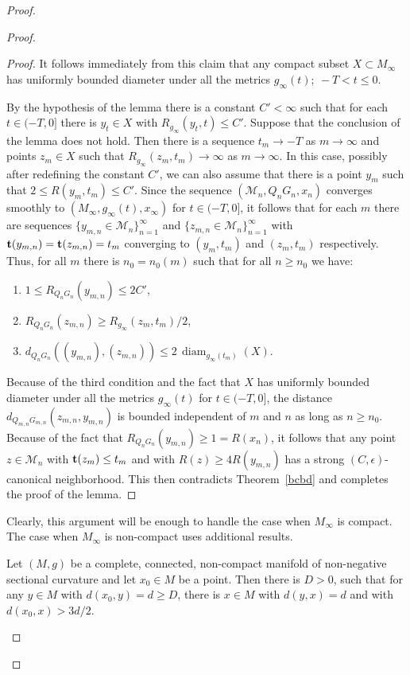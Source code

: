 \begin{proof}
\begin{proof}
\begin{proof}
It follows immediately from this claim that any compact subset
$X\subset M_\infty$ has uniformly bounded diameter under all the
metrics $g_\infty(t);\ -T<t\le 0$.

By the hypothesis of the lemma there is a constant $C'<\infty$ such
that for each $t\in (-T,0]$ there is $y_{t}\in X$ with
$R_{g_\infty}(y_{t},t)\le C'$. Suppose that the conclusion of the
lemma does not hold. Then there is a sequence $t_m\rightarrow -T$ as
$m\rightarrow\infty$ and points $z_m\in X$ such that
$R_{g_\infty}(z_m,t_m)\rightarrow\infty$ as $m\rightarrow\infty$. In
this case, possibly after redefining the constant $C'$, we can also
assume that there is a point $y_m$ such that $2\le R(y_m,t_m)\le
C'$. Since the sequence $({\mathcal M}_n,Q_nG_n,x_n)$ converges
smoothly to $(M_\infty,g_\infty(t),x_\infty)$ for $t\in (-T,0]$, it
follows that for each $m$ there are sequences $\{y_{m,n}\in
{\mathcal M}_n\}_{n=1}^\infty$ and $\{z_{m,n}\in {\mathcal
M}_n\}_{n=1}^\infty$ with ${\bf t}(y_{m,n})={\bf t}(z_{m,n})=t_m$
converging to $(y_m,t_m)$ and $(z_m,t_m)$ respectively. Thus, for
all $m$ there is $n_0=n_0(m)$ such that for all $n\ge n_0$ we have:
\begin{enumerate}
\item[(1)] $1\le R_{Q_nG_n}(y_{m,n})\le 2C'$,
\item[(2)] $R_{Q_nG_n}(z_{m,n})\ge R_{g_\infty}(z_m,t_m)/2$,
\item[(3)] $d_{Q_nG_n}((y_{m,n}),(z_{m,n}))\le 2\,\operatorname{diam}_{g_\infty(t_m)}(X).$
\end{enumerate}
Because of the third condition and the fact that $X$ has uniformly
bounded diameter under all the metrics $g_\infty(t)$ for $t\in
(-T,0]$, the distance $d_{Q_{m,n}G_{m,n}}(z_{m,n},y_{m,n})$ is
bounded independent of $m$ and $n$ as long as $n\ge n_0$. Because of
the fact that $R_{Q_nG_n}(y_{m,n})\ge 1=R(x_n)$, it follows that any
point $z\in {\mathcal M}_n$ with ${\bf t}(z_m)\le t_{m}$ and with
$R(z)\ge 4R(y_{m,n})$ has a strong $(C,\epsilon)$-canonical
neighborhood. This then
contradicts Theorem~\ref{bcbd} and completes the proof of the lemma.
\end{proof}



Clearly, this argument will be enough to handle the case when
$M_\infty$ is compact. The case when $M_\infty$ is non-compact uses
additional results.

\begin{lemma}
\label{lem:far-point-with-distant-antipode}
Let $(M,g)$ be a complete, connected, non-compact manifold of
non-negative sectional curvature and let $x_0\in M$ be a point. Then
there is $D>0$, such that for any $y\in M$ with $d(x_0,y)=d\ge D$,
there is $x\in M$ with $d(y,x)=d$ and with $d(x_0,x)>3d/2$.
\end{lemma}



\end{proof}
\end{proof}
